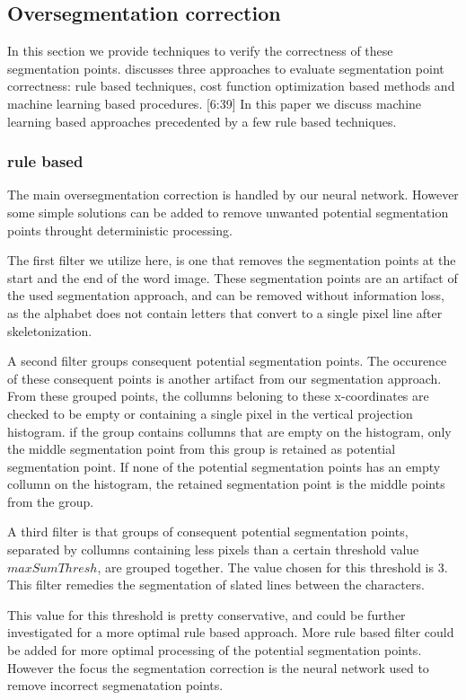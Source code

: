 \documentclass{article}
\begin{document}
\subsection{Oversegmentation correction}
In this section we provide techniques to verify the correctness of these segmentation points. 
\citep{evalsplitpoints} discusses three approaches to evaluate segmentation point correctness: rule based techniques, cost function optimization based methods and machine learning based procedures. [6:39]
In this paper we discuss machine learning based approaches precedented by a few rule based techniques.

\subsubsection{rule based}
The main oversegmentation correction is handled by our neural network.
However some simple solutions can be added to remove unwanted potential segmentation points throught deterministic processing.

The first filter we utilize here, is one that removes the segmentation points at the start and the end of the word image.
These segmentation points are an artifact of the used segmentation approach, and can be removed without information loss, as the alphabet does not contain letters that convert to a single pixel line after skeletonization.

A second filter groups consequent potential segmentation points.
The occurence of these consequent points is another artifact from our segmentation approach.
From these grouped points, the collumns beloning to these x-coordinates are checked to be empty or containing a single pixel in the vertical projection histogram.
if the group contains collumns that are empty on the histogram, only the middle segmentation point from this group is retained as potential segmentation point.
If none of the potential segmentation points has an empty collumn on the histogram, the retained segmentation point is the middle points from the group.

A third filter is that groups of consequent potential segmentation points, separated by collumns containing less pixels than a certain threshold value $maxSumThresh$, are grouped together.
The value chosen for this threshold is 3.
This filter remedies the segmentation of slated lines between the characters.

This value for this threshold is pretty conservative, and could be further investigated for a more optimal rule based approach.
More rule based filter could be added for more optimal processing of the potential segmentation points.
However the focus the segmentation correction is the neural network used to remove incorrect segmenatation points.
\end{document}
